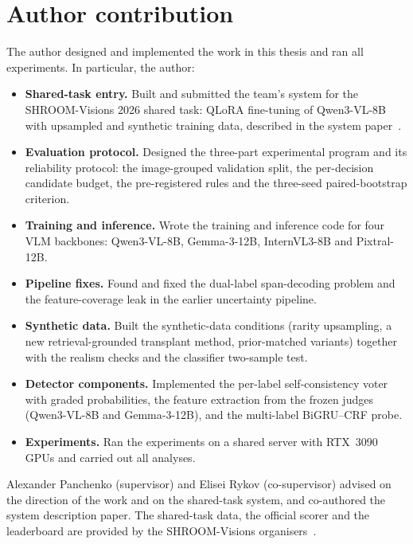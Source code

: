 \chapter{Author contribution}

The author designed and implemented the work in this thesis and ran all experiments. In particular, the author:
\begin{itemize}
    \item \textbf{Shared-task entry.} Built and submitted the team's system for the SHROOM-Visions 2026 shared task: QLoRA fine-tuning of Qwen3-VL-8B with upsampled and synthetic training data, described in the system paper~\cite{rattanajaratkul2026smurfcat}.
    \item \textbf{Evaluation protocol.} Designed the three-part experimental program and its reliability protocol: the image-grouped validation split, the per-decision candidate budget, the pre-registered rules and the three-seed paired-bootstrap criterion.
    \item \textbf{Training and inference.} Wrote the training and inference code for four VLM backbones: Qwen3-VL-8B, Gemma-3-12B, InternVL3-8B and Pixtral-12B.
    \item \textbf{Pipeline fixes.} Found and fixed the dual-label span-decoding problem and the feature-coverage leak in the earlier uncertainty pipeline.
    \item \textbf{Synthetic data.} Built the synthetic-data conditions (rarity upsampling, a new retrieval-grounded transplant method, prior-matched variants) together with the realism checks and the classifier two-sample test.
    \item \textbf{Detector components.} Implemented the per-label self-consistency voter with graded probabilities, the feature extraction from the frozen judges (Qwen3-VL-8B and Gemma-3-12B), and the multi-label BiGRU--CRF probe.
    \item \textbf{Experiments.} Ran the experiments on a shared server with RTX~3090 GPUs and carried out all analyses.
\end{itemize}

Alexander Panchenko (supervisor) and Elisei Rykov (co-supervisor) advised on the direction of the work and on the shared-task system, and co-authored the system description paper. The shared-task data, the official scorer and the leaderboard are provided by the SHROOM-Visions organisers~\cite{vazquez2026shroomvisionsoverview}.
